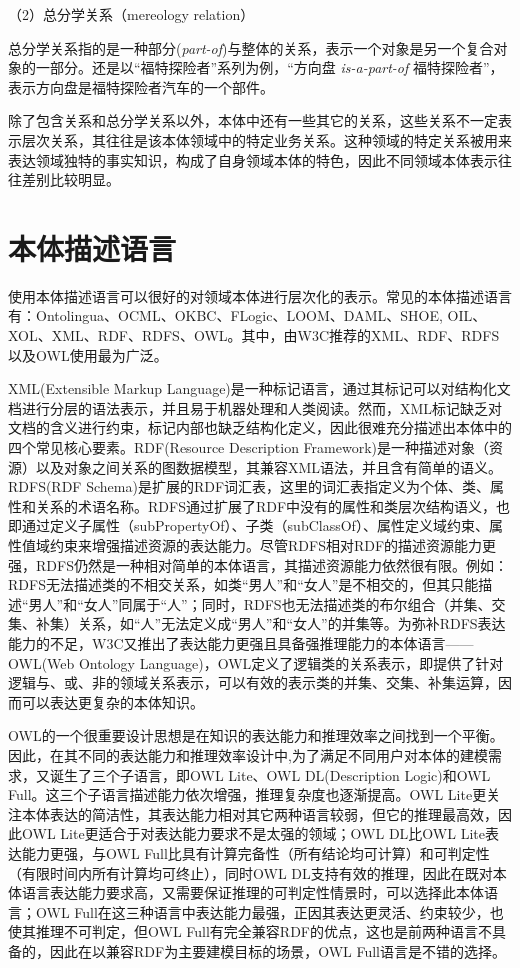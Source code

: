 （2）总分学关系（mereology relation）

总分学关系指的是一种部分(\textit{part-of})与整体的关系，表示一个对象是另一个复合对象的一部分。还是以“福特探险者”系列为例，“方向盘 \textit{is-a-part-of} 福特探险者”，表示方向盘是福特探险者汽车的一个部件。

除了包含关系和总分学关系以外，本体中还有一些其它的关系，这些关系不一定表示层次关系，其往往是该本体领域中的特定业务关系。这种领域的特定关系被用来表达领域独特的事实知识，构成了自身领域本体的特色，因此不同领域本体表示往往差别比较明显。

\section{本体描述语言}
使用本体描述语言可以很好的对领域本体进行层次化的表示。常见的本体描述语言有：Ontolingua、OCML、OKBC、FLogic、LOOM、DAML、SHOE, OIL、XOL、XML、RDF、RDFS、OWL\cite{Corcho}。其中，由W3C推荐的XML、RDF、RDFS以及OWL使用最为广泛。

XML(Extensible Markup Language)\cite{xml}是一种标记语言，通过其标记可以对结构化文档进行分层的语法表示，并且易于机器处理和人类阅读。然而，XML标记缺乏对文档的含义进行约束，标记内部也缺乏结构化定义，因此很难充分描述出本体中的四个常见核心要素。RDF(Resource Description Framework)\cite{rdf}是一种描述对象（资源）以及对象之间关系的图数据模型，其兼容XML语法，并且含有简单的语义。RDFS(RDF Schema)\cite{rdfs}是扩展的RDF词汇表，这里的词汇表指定义为个体、类、属性和关系的术语名称。RDFS通过扩展了RDF中没有的属性和类层次结构语义，也即通过定义子属性（subPropertyOf）、子类（subClassOf）、属性定义域约束、属性值域约束来增强描述资源的表达能力。尽管RDFS相对RDF的描述资源能力更强，RDFS仍然是一种相对简单的本体语言，其描述资源能力依然很有限\cite{gao}。例如：RDFS无法描述类的不相交关系，如类“男人”和“女人”是不相交的，但其只能描述“男人”和“女人”同属于“人”；同时，RDFS也无法描述类的布尔组合（并集、交集、补集）关系，如“人”无法定义成“男人”和“女人”的并集等。为弥补RDFS表达能力的不足，W3C又推出了表达能力更强且具备强推理能力的本体语言——OWL(Web Ontology Language)\cite{owl}，OWL定义了逻辑类的关系表示，即提供了针对逻辑与、或、非的领域关系表示，可以有效的表示类的并集、交集、补集运算，因而可以表达更复杂的本体知识。

OWL的一个很重要设计思想是在知识的表达能力和推理效率之间找到一个平衡。因此，在其不同的表达能力和推理效率设计中,为了满足不同用户对本体的建模需求，又诞生了三个子语言，即OWL Lite、OWL DL(Description Logic)和OWL Full。这三个子语言描述能力依次增强，推理复杂度也逐渐提高。OWL Lite更关注本体表达的简洁性，其表达能力相对其它两种语言较弱，但它的推理最高效，因此OWL Lite更适合于对表达能力要求不是太强的领域；OWL DL比OWL Lite表达能力更强，与OWL Full比具有计算完备性（所有结论均可计算）和可判定性（有限时间内所有计算均可终止），同时OWL DL支持有效的推理，因此在既对本体语言表达能力要求高，又需要保证推理的可判定性情景时，可以选择此本体语言；OWL Full在这三种语言中表达能力最强，正因其表达更灵活、约束较少，也使其推理不可判定，但OWL Full有完全兼容RDF的优点，这也是前两种语言不具备的，因此在以兼容RDF为主要建模目标的场景，OWL Full语言是不错的选择。

